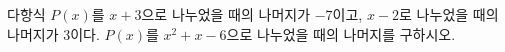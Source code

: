 다항식 $P(x)$를 $x+3$으로 나누었을 때의 나머지가 $-7$이고, $x-2$로 나누었을 때의 나머지가 $3$이다. $P(x)$를 $x^2+x-6$으로 나누었을 때의 나머지를 구하시오.
